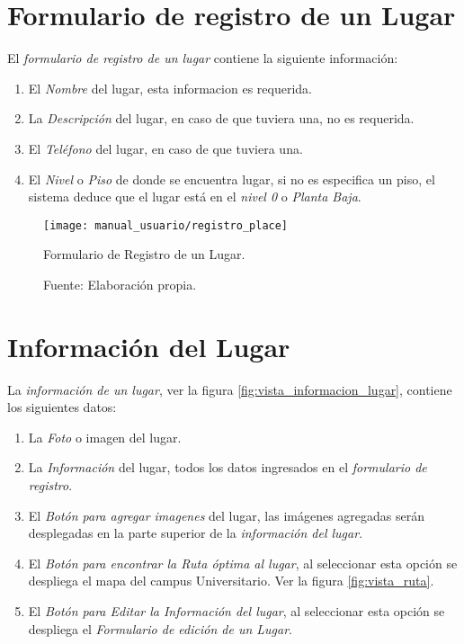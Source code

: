 \section{Formulario de registro de un Lugar}

El \emph{formulario de registro de un lugar} contiene la siguiente información:
\begin{enumerate}
  \item El \emph{Nombre} del lugar, esta informacion es requerida.
  \item La \emph{Descripción} del lugar, en caso de que tuviera una, no es requerida.
  \item El \emph{Teléfono} del lugar, en caso de que tuviera una.
  \item El \emph{Nivel} o \emph{Piso} de donde se encuentra lugar, si no es especifica un piso, el sistema deduce que el lugar está en el \emph{nivel 0} o \emph{Planta Baja}.
\end{enumerate}

\begin{figure}[H]
      \begin{center}
        \texttt{[image: manual\_usuario/registro\_place]}

        \caption{Formulario de Registro de un Lugar.}
        \label{fig:vista_registro_place}
        \caption*{Fuente: Elaboración propia.}
      \end{center}
\end{figure}

\section{Información del Lugar}

La \emph{información de un lugar}, ver la figura \ref{fig:vista_informacion_lugar}, contiene los siguientes datos:
\begin{enumerate}
  \item La \emph{Foto} o imagen del lugar.
  \item La \emph{Información} del lugar, todos los datos ingresados en el \emph{formulario de registro}.
  \item El \emph{Botón para agregar imagenes} del lugar, las imágenes agregadas serán desplegadas en la parte superior de la \emph{información del lugar}.
  \item El \emph{Botón para encontrar la Ruta óptima al lugar}, al seleccionar esta opción se despliega el mapa del campus Universitario. Ver la figura \ref{fig:vista_ruta}.
  \item El \emph{Botón para Editar la Información del lugar}, al seleccionar esta opción se despliega el \emph{Formulario de edición de un Lugar}.
\end{enumerate}


